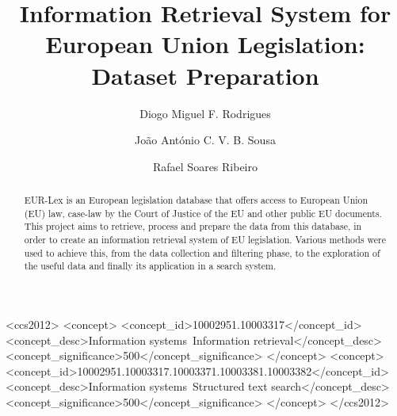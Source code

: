 \documentclass[sigconf, authorversion]{acmart}
\begin{document}
\title{Information Retrieval System for European Union Legislation: Dataset Preparation}

\author{Diogo Miguel F. Rodrigues}

\author{João António C. V. B. Sousa}

\author{Rafael Soares Ribeiro}

\renewcommand{\shortauthors}{Rodrigues, Sousa and Ribeiro}

\begin{abstract}
    EUR-Lex is an European legislation database that offers access to European Union (EU) law,
    case-law by the Court of Justice of the EU and other public EU documents.
    This project aims to retrieve, process and prepare the data from this database, in order to create an information retrieval system of EU legislation.
    Various methods were used to achieve this, from the data collection and filtering phase, to the exploration of the useful data and finally its application in a search system.
\end{abstract}

\begin{CCSXML}
<ccs2012>
<concept>
<concept_id>10002951.10003317</concept_id>
<concept_desc>Information systems~Information retrieval</concept_desc>
<concept_significance>500</concept_significance>
</concept>
<concept>
<concept_id>10002951.10003317.10003371.10003381.10003382</concept_id>
<concept_desc>Information systems~Structured text search</concept_desc>
<concept_significance>500</concept_significance>
</concept>
</ccs2012>
\end{CCSXML}


\end{document}
